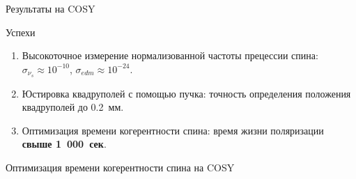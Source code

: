 \documentclass[14pt]{beamer}
\begin{document}
\begin{frame}{Результаты на COSY}
	\begin{block}{Успехи}
		\begin{enumerate}
			\item Высокоточное измерение нормализованной частоты прецессии спина: $\sigma_{\nu_s}\approx 10^{-10}$, $\sigma_{edm}\approx 10^{-24}$\ecm.
			\item Юстировка квадруполей с помощью пучка: точность определения положения квадруполей до 0.2~мм.
			\item Оптимизация времени когерентности спина: время жизни поляризации \textbf{свыше 1~000~сек}.
		\end{enumerate}
	\end{block}
\end{frame}
\begin{frame}{Оптимизация времени когерентности спина на COSY}
		\centering
\end{frame}
\end{document}
